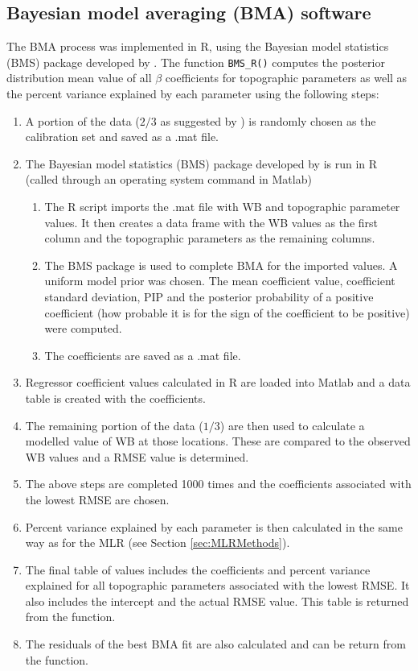 \documentclass{sfuthesis}
\begin{document}
\begin{appendices}
	\chapter{Bayesian model averaging (BMA) software}
\label{sec:BMAmethods}
The BMA process was implemented in R, using the Bayesian model statistics (BMS) package developed by \cite{Zeugner2015}. The function \texttt{BMS\_R()} computes the posterior distribution mean value of all $\beta$ coefficients for topographic parameters as well as the percent variance explained by each parameter using the following steps:
\begin{enumerate}
\item A portion of the data ($2/3$ as suggested by \cite{Kohavi1995}) is randomly chosen as the calibration set and saved as a .mat file. 
\item The Bayesian model statistics (BMS) package developed by \cite{Zeugner2015} is run in R (called through an operating system command in Matlab)
	\begin{enumerate}
		\item The R script imports the .mat file with WB and topographic parameter values. It then creates a data frame with the WB values as the first column and the topographic parameters as the remaining 	columns. 
		\item The BMS package is used to complete BMA for the imported values. A uniform model prior was chosen. The mean coefficient value, coefficient standard deviation, PIP and the posterior probability of a positive coefficient (how probable it is for the sign of the coefficient to be positive) were computed.
		\item The coefficients are saved as a .mat file.
	\end{enumerate}
\item Regressor coefficient values calculated in R are loaded into Matlab and a data table is created with the coefficients.
\item The remaining portion of the data ($1/3$) are then used to calculate a modelled value of WB at those locations. These are compared to the observed WB values and a RMSE value is determined.
\item The above steps are completed 1000 times and the coefficients associated with the lowest RMSE are chosen.
\item Percent variance explained by each parameter is then calculated in the same way as for the MLR (see Section \ref{sec:MLRMethods}). 
\item The final table of values includes the coefficients and percent variance explained for all topographic parameters associated with the lowest RMSE. It also includes the intercept and the actual RMSE value. This table is returned from the function.
\item The residuals of the best BMA fit are also calculated and can be return from the function.  
\end{enumerate}
	



\end{appendices}
\end{document}
